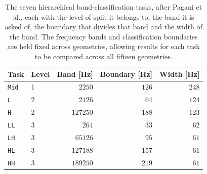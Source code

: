 \begin{table}[!tbp]
    \centering
\small
    \setlength{\tabcolsep}{5pt}
    \begin{tabular}{@{}llrrr@{}}
        \toprule
        \textbf{Task} & \textbf{Level} & \textbf{Band [Hz]} & \textbf{Boundary [Hz]} & \textbf{Width [Hz]} \\
        \midrule
        \texttt{Mid} & 1 & $2$\textendash{}$250$   & $126$ & $248$ \\
        \midrule
        \texttt{L}   & 2 & $2$\textendash{}$126$   & $64$  & $124$ \\
        \rowsep%
        \texttt{H}   & 2 & $127$\textendash{}$250$ & $188$ & $123$ \\
        \midrule
        \texttt{LL}  & 3 & $2$\textendash{}$64$    & $33$  & $62$ \\
        \rowsep%
        \texttt{LH}  & 3 & $65$\textendash{}$126$  & $95$  & $61$ \\
        \rowsep%
        \texttt{HL}  & 3 & $127$\textendash{}$188$ & $157$ & $61$ \\
        \rowsep%
        \texttt{HH}  & 3 & $189$\textendash{}$250$ & $219$ & $61$ \\
        \bottomrule
    \end{tabular}
\caption{The seven hierarchical band-classification tasks, after Pagani et al.\autocite{paganiPreliminaryInsightsChronos2026}, each with the level of split it belongs to, the band it is asked of, the boundary that divides that band and the width of the band. The frequency bands and classification boundaries are held fixed across geometries, allowing results for each task to be compared across all fifteen geometries.}%
    \label{tab:bandTasks}
\end{table}
